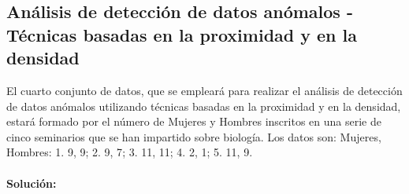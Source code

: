 \documentclass[a4paper, 12pt]{article}
\begin{document}
		\subsection{Análisis de detección de datos anómalos - Técnicas basadas en la proximidad y en la densidad}
		El cuarto conjunto de datos, que se empleará para realizar el análisis de detección de datos anómalos utilizando técnicas basadas en la proximidad y en la densidad, estará formado por el número de Mujeres y Hombres inscritos en una serie de cinco seminarios que se han impartido sobre biología. Los datos son: {Mujeres, Hombres}: 1. {9, 9}; 2. {9, 7}; 3. {11, 11}; 4. {2, 1}; 5. {11, 9}.
		
		\paragraph{Solución:}
\end{document}
